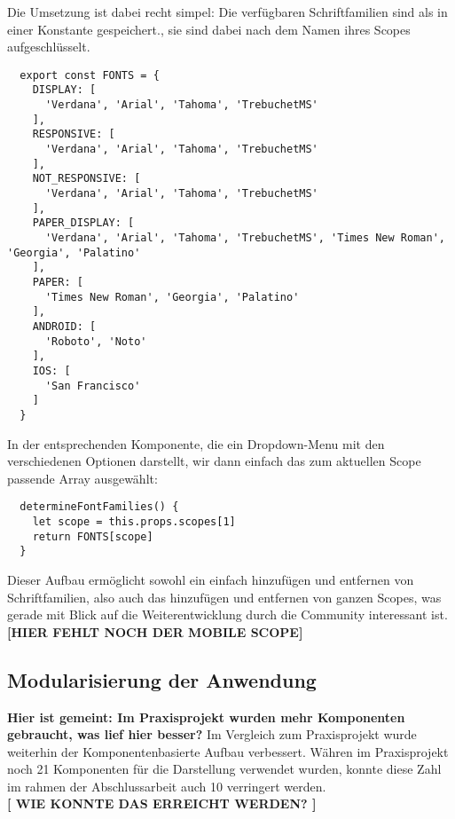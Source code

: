 Die Umsetzung ist dabei recht simpel: Die verfügbaren Schriftfamilien sind als in einer Konstante gespeichert., sie sind dabei nach dem Namen ihres Scopes aufgeschlüsselt.

\begin{lstlisting}
  export const FONTS = {
    DISPLAY: [
      'Verdana', 'Arial', 'Tahoma', 'TrebuchetMS'
    ],
    RESPONSIVE: [
      'Verdana', 'Arial', 'Tahoma', 'TrebuchetMS'
    ],
    NOT_RESPONSIVE: [
      'Verdana', 'Arial', 'Tahoma', 'TrebuchetMS'
    ],
    PAPER_DISPLAY: [
      'Verdana', 'Arial', 'Tahoma', 'TrebuchetMS', 'Times New Roman', 'Georgia', 'Palatino'
    ],
    PAPER: [
      'Times New Roman', 'Georgia', 'Palatino'
    ],
    ANDROID: [
      'Roboto', 'Noto'
    ],
    IOS: [
      'San Francisco'
    ]
  }
\end{lstlisting}

In der entsprechenden Komponente, die ein Dropdown-Menu mit den verschiedenen Optionen darstellt, wir dann einfach das zum aktuellen Scope passende Array ausgewählt:

\begin{lstlisting}
  determineFontFamilies() {
    let scope = this.props.scopes[1]
    return FONTS[scope]
  }
\end{lstlisting}

Dieser Aufbau ermöglicht sowohl ein einfach hinzufügen und entfernen von Schriftfamilien, also auch das hinzufügen und entfernen von ganzen Scopes, was gerade mit Blick auf die Weiterentwicklung durch die Community interessant ist.\\

\textbf{[HIER FEHLT NOCH DER MOBILE SCOPE]}\\

\subsection{Modularisierung der Anwendung}
\textbf{Hier ist gemeint: Im Praxisprojekt wurden mehr Komponenten gebraucht, was lief hier besser?}
Im Vergleich zum Praxisprojekt wurde weiterhin der Komponentenbasierte Aufbau verbessert. Währen im Praxisprojekt noch 21 Komponenten für die Darstellung verwendet wurden, konnte diese Zahl im rahmen der Abschlussarbeit auch 10 verringert werden.\\
\textbf{[ WIE KONNTE DAS ERREICHT WERDEN? ]}

